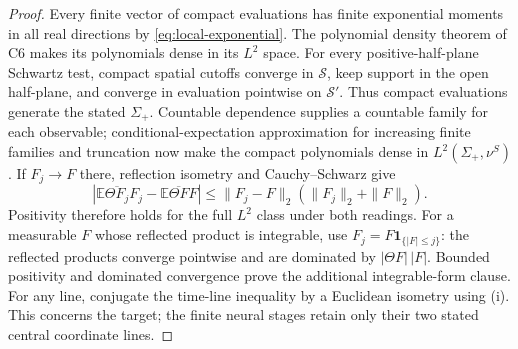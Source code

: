 \documentclass[11pt]{article}
\theoremstyle{plain}
\theoremstyle{definition}
\theoremstyle{remark}
\newcommand{\E}{\mathbb{E}}
\newcommand{\cS}{\mathcal{S}}
\newcommand{\ind}{\mathbf{1}}
\newcommand{\conj}[1]{\overline{#1}}
\begin{document}
\begin{proof}
Every finite vector of compact evaluations has finite exponential moments
in all real directions by \eqref{eq:local-exponential}. The polynomial
density theorem of C6 makes its polynomials dense in its $L^2$ space.
For every positive-half-plane Schwartz test, compact spatial cutoffs
converge in $\cS$, keep support in the open half-plane, and converge in
evaluation pointwise on $\cS'$. Thus compact evaluations generate the
stated $\Sigma_+$. Countable dependence supplies a countable family for
each observable; conditional-expectation approximation for increasing
finite families and truncation now make the compact polynomials dense
in $L^2(\Sigma_+,\nu^S)$. If $F_j\to F$ there, reflection isometry and
Cauchy--Schwarz give
\[
 \left|\E\conj{\Theta F_j}F_j-\E\conj{\Theta F}F\right|
 \le\|F_j-F\|_2(\|F_j\|_2+\|F\|_2).
\]
Positivity therefore holds for the full $L^2$ class under both readings.
For a measurable $F$ whose reflected product is integrable, use
$F_j=F\ind_{\{|F|\le j\}}$: the reflected products converge pointwise
and are dominated by $|\Theta F|\,|F|$. Bounded positivity and dominated
convergence prove the additional integrable-form clause. For any line,
conjugate the time-line inequality by a Euclidean isometry using (i).
This concerns the target; the finite neural stages retain only their two
stated central coordinate lines.


\end{proof}
\end{document}
